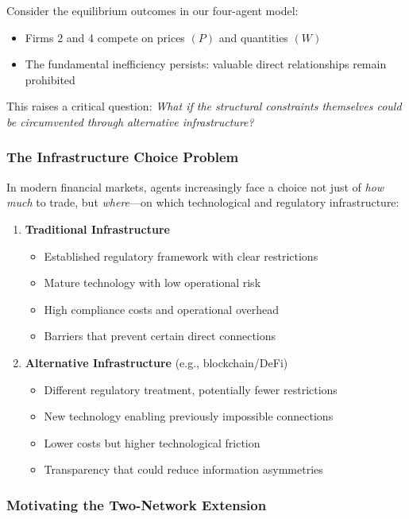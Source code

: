 Consider the equilibrium outcomes in our four-agent model:
\begin{itemize}
    \item Firms 2 and 4 compete on prices $(P)$ and quantities $(W)$
    \item The fundamental inefficiency persists: valuable direct relationships remain prohibited
\end{itemize}

This raises a critical question: \textit{What if the structural constraints themselves could be circumvented through alternative infrastructure?}

\subsubsection{The Infrastructure Choice Problem}

In modern financial markets, agents increasingly face a choice not just of \textit{how much} to trade, but \textit{where}—on which technological and regulatory infrastructure:

\begin{enumerate}
    \item \textbf{Traditional Infrastructure}
    \begin{itemize}
        \item Established regulatory framework with clear restrictions
        \item Mature technology with low operational risk
        \item High compliance costs and operational overhead
        \item Barriers that prevent certain direct connections
    \end{itemize}
    
    \item \textbf{Alternative Infrastructure} (e.g., blockchain/DeFi)
    \begin{itemize}
        \item Different regulatory treatment, potentially fewer restrictions
        \item New technology enabling previously impossible connections
        \item Lower costs but higher technological friction
        \item Transparency that could reduce information asymmetries
    \end{itemize}
\end{enumerate}

\subsubsection{Motivating the Two-Network Extension}

